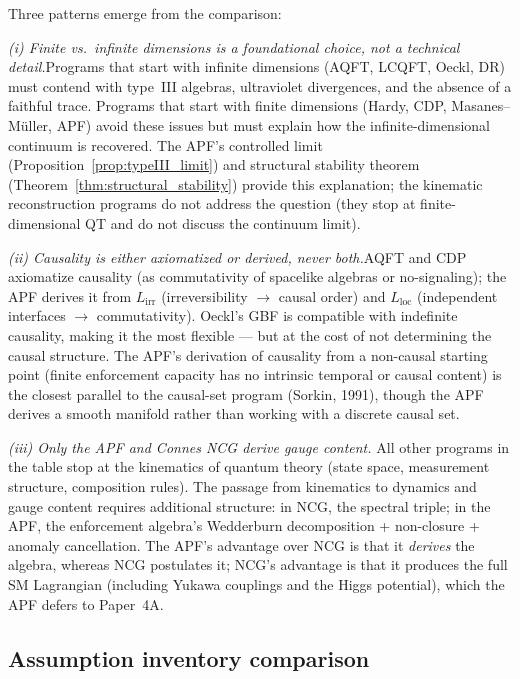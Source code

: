 \documentclass[11pt,a4paper]{article}
\theoremstyle{definition}
\begin{document}
\smallskip\noindent Three patterns emerge from the comparison:

\textit{(i) Finite vs.\ infinite dimensions is a foundational choice,
not a technical detail.}\quad Programs that start with infinite
dimensions (AQFT, LCQFT, Oeckl, DR) must contend with type~III
algebras, ultraviolet divergences, and the absence of a faithful
trace.  Programs that start with finite dimensions (Hardy, CDP,
Masanes--M\"uller, APF) avoid these issues but must explain how the
infinite-dimensional continuum is recovered.  The APF's controlled
limit (Proposition~\ref{prop:typeIII_limit}) and structural stability
theorem (Theorem~\ref{thm:structural_stability}) provide this
explanation; the kinematic reconstruction programs do not address the
question (they stop at finite-dimensional QT and do not discuss the
continuum limit).

\textit{(ii) Causality is either axiomatized or derived, never
both.}\quad AQFT and CDP axiomatize causality (as commutativity of
spacelike algebras or no-signaling); the APF derives it from
$L_{\mathrm{irr}}$ (irreversibility $\to$ causal order) and
$L_{\mathrm{loc}}$ (independent interfaces $\to$ commutativity).
Oeckl's GBF is compatible with indefinite causality, making it the
most flexible --- but at the cost of not determining the causal
structure.  The APF's derivation of causality from a non-causal
starting point (finite enforcement capacity has no intrinsic temporal
or causal content) is the closest parallel to the causal-set program
(Sorkin, 1991), though the APF derives a smooth manifold rather than
working with a discrete causal set.

\textit{(iii) Only the APF and Connes NCG derive gauge content.}\quad
All other programs in the table stop at the kinematics of quantum
theory (state space, measurement structure, composition rules).  The
passage from kinematics to dynamics and gauge content requires
additional structure: in NCG, the spectral triple; in the APF, the
enforcement algebra's Wedderburn decomposition + non-closure +
anomaly cancellation.  The APF's advantage over NCG is that it
\emph{derives} the algebra, whereas NCG postulates it; NCG's
advantage is that it produces the full SM Lagrangian (including Yukawa
couplings and the Higgs potential), which the APF defers to Paper~4A.


\subsection{Assumption inventory comparison}
\label{sec:assumption_comparison}
\end{document}
